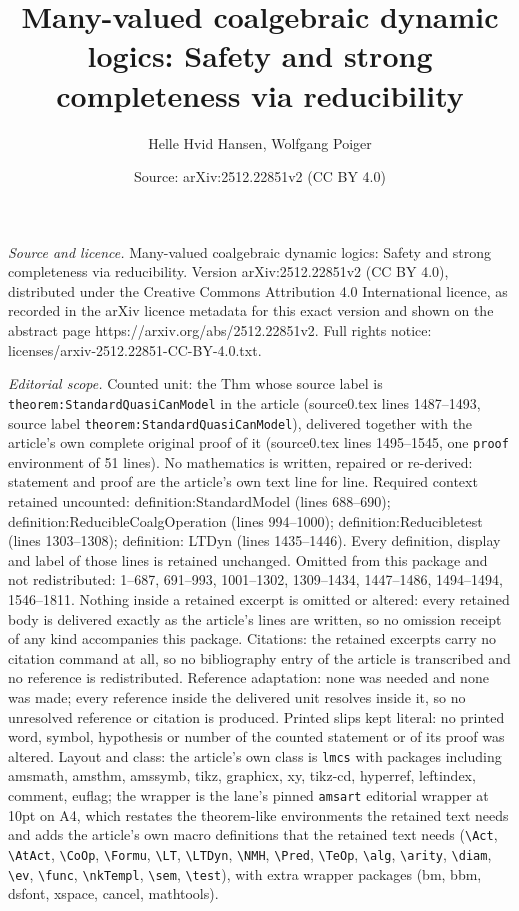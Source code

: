\documentclass[10pt,a4paper]{amsart}
\title[Many-valued coalgebraic dynamic logics: Safety and strong co]{Many-valued coalgebraic dynamic logics: Safety and strong completeness via reducibility}
\author{Helle Hvid Hansen, Wolfgang Poiger}
\date{Source: arXiv:2512.22851v2 (CC BY 4.0)}
\begin{document}
\maketitle

\noindent\emph{Source and licence.} Many-valued coalgebraic dynamic logics: Safety and strong completeness via reducibility. Version arXiv:2512.22851v2 (CC BY 4.0), distributed under the Creative Commons Attribution 4.0 International licence, as recorded in the arXiv licence metadata for this exact version and shown on the abstract page https://arxiv.org/abs/2512.22851v2. Full rights notice: licenses/arxiv-2512.22851-CC-BY-4.0.txt.\par\smallskip

\noindent\textit{Editorial scope.} Counted unit: the Thm whose source label is \texttt{theorem:StandardQuasiCanModel} in the article (source0.tex lines 1487--1493, source label \texttt{theorem:StandardQuasiCanModel}), delivered together with the article's own complete original proof of it (source0.tex lines 1495--1545, one \texttt{proof} environment of 51 lines). No mathematics is written, repaired or re-derived: statement and proof are the article's own text line for line. Required context retained uncounted: definition:StandardModel (lines 688--690); definition:ReducibleCoalgOperation (lines 994--1000); definition:Reducibletest (lines 1303--1308); definition: LTDyn (lines 1435--1446). Every definition, display and label of those lines is retained unchanged. Omitted from this package and not redistributed: 1--687, 691--993, 1001--1302, 1309--1434, 1447--1486, 1494--1494, 1546--1811. Nothing inside a retained excerpt is omitted or altered: every retained body is delivered exactly as the article's lines are written, so no omission receipt of any kind accompanies this package. Citations: the retained excerpts carry no citation command at all, so no bibliography entry of the article is transcribed and no reference is redistributed. Reference adaptation: none was needed and none was made; every reference inside the delivered unit resolves inside it, so no unresolved reference or citation is produced. Printed slips kept literal: no printed word, symbol, hypothesis or number of the counted statement or of its proof was altered. Layout and class: the article's own class is \texttt{lmcs} with packages including amsmath, amsthm, amssymb, tikz, graphicx, xy, tikz-cd, hyperref, leftindex, comment, euflag; the wrapper is the lane's pinned \texttt{amsart} editorial wrapper at 10pt on A4, which restates the theorem-like environments the retained text needs and adds the article's own macro definitions that the retained text needs (\texttt{\textbackslash Act}, \texttt{\textbackslash AtAct}, \texttt{\textbackslash CoOp}, \texttt{\textbackslash Formu}, \texttt{\textbackslash LT}, \texttt{\textbackslash LTDyn}, \texttt{\textbackslash NMH}, \texttt{\textbackslash Pred}, \texttt{\textbackslash TeOp}, \texttt{\textbackslash alg}, \texttt{\textbackslash arity}, \texttt{\textbackslash diam}, \texttt{\textbackslash ev}, \texttt{\textbackslash func}, \texttt{\textbackslash nkTempl}, \texttt{\textbackslash sem}, \texttt{\textbackslash test}), with extra wrapper packages (bm, bbm, dsfont, xspace, cancel, mathtools). 
\end{document}
